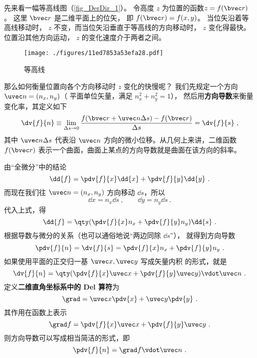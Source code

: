 
先来看一幅等高线图（\autoref{fig_DerDir_1}）。 令高度 $z$ 为位置的函数$z = f(\bvec r)$。 这里 $\bvec r$ 是二维平面上的位矢， 即 $f(\bvec r) = f(x,y)$。 当位矢沿着等高线移动时， $z$ 不变，而当位矢沿垂直于等高线的方向移动时， $z$ 变化得最快。位置沿其他方向运动， $z$ 的变化速度介于两者之间。

\begin{figure}[ht]
\centering
\texttt{[image: ./figures/11ed7853a53efa28.pdf]}
\caption{等高线}\label{fig_DerDir_1}
\end{figure}

那么如何衡量位置向各个方向移动时 $z$ 变化的快慢呢？ 我们先规定一个方向 $\uvec n = (n_x,n_y)$（ 平面单位矢量，满足 $n_x^2 + n_y^2 = 1$）， 然后用\textbf{方向导数}来衡量变化率，其定义如下
 \begin{equation}
\dv{f}{n} \equiv \lim_{\Delta s \to 0} \frac{f(\bvec r + \uvec n\Delta s) - f(\bvec r)}{\Delta s} = \dv{f}{s}~,
\end{equation}
其中 $\uvec n\Delta s$ 代表沿 $\uvec n$ 方向的微小位移。从几何上来讲，二维函数 $f(\bvec r)$ 表示一个曲面，曲面上某点的方向导数就是曲面在该方向的斜率。


由“全微分”中的结论
\begin{equation}
\dd{f} = \pdv{f}{x} \dd{x} + \pdv{f}{y} \dd{y}~.
\end{equation}
而现在我们往 $\uvec n = (n_x, n_y)$ 方向移动 $\dd{s}$，所以
\begin{equation}
\dd{x} = n_x \dd{s} ~,\qquad \dd{y} = n_y \dd{s}~.
\end{equation}
代入上式，得
\begin{equation}
\dd{f} =  \qty(\pdv{f}{x} n_x + \pdv{f}{y} n_y ) \dd{s}~.
\end{equation}
根据导数与微分的关系（也可以通俗地说“两边同除 $\dd{s}$”）， 就得到方向导数
\begin{equation}
\pdv{f}{n} = \dv{f}{s} = \pdv{f}{x} n_x + \pdv{f}{y} n_y~.
\end{equation}
如果使用平面的正交归一基 $\uvec x, \uvec y$ 写成矢量内积 的形式，就是
\begin{equation}
\dv{f}{n} = \qty( \pdv{f}{x}\uvec x + \pdv{f}{y}\uvec y ) \vdot \uvec n~.
\end{equation} 
定义\textbf{二维直角坐标系中的 Del 算符}为
\begin{equation}
\grad  = \uvec x\pdv{x} + \uvec y\pdv{y}~.
\end{equation}
其作用在函数上表示
\begin{equation}
\grad f = \pdv{f}{x}\uvec x + \pdv{f}{y}\uvec y~.
\end{equation} 
则方向导数可以写成相当简洁的形式，即
\begin{equation}\label{eq_DerDir_7}
\pdv{f}{n} = \grad f \vdot \uvec n~.
\end{equation} 

